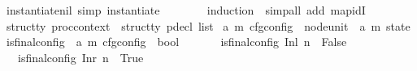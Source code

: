 \begin{isabellebody}
\isanewline
{}\isamarkupfalse%
\ instantiate{\isacharunderscore}{\kern0pt}nil\ {\isacharbrackleft}{\kern0pt}simp{\isacharbrackright}{\kern0pt}{\isacharcolon}{\kern0pt}\ {\isachardoublequoteopen}instantiate\ {\isacharbrackleft}{\kern0pt}{\isacharbrackright}{\kern0pt}\ {\isasymtau}\ {\isacharequal}{\kern0pt}\ {\isasymtau}{\isachardoublequoteclose}\isanewline
%
\isadelimproof
\ \ %
\endisadelimproof
%
\isatagproof
{}\isamarkupfalse%
\ {\isacharparenleft}{\kern0pt}induction\ {\isasymtau}{\isacharparenright}{\kern0pt}\ {\isacharparenleft}{\kern0pt}simp{\isacharunderscore}{\kern0pt}all\ add{\isacharcolon}{\kern0pt}\ map{\isacharunderscore}{\kern0pt}idI{\isacharparenright}{\kern0pt}%
\endisatagproof
{\isafoldproof}%
%
\isadelimproof
\isanewline
%
\endisadelimproof
\isanewline
{}\isamarkupfalse%
\ {\isacharprime}{\kern0pt}struct{\isacharunderscore}{\kern0pt}ty\ proc{\isacharunderscore}{\kern0pt}context\ {\isacharequal}{\kern0pt}\ {\isachardoublequoteopen}{\isacharprime}{\kern0pt}struct{\isacharunderscore}{\kern0pt}ty\ pdecl\ list{\isachardoublequoteclose}\isanewline
\isanewline
{}\isamarkupfalse%
\ {\isacharparenleft}{\kern0pt}{\isacharprime}{\kern0pt}a{\isacharcomma}{\kern0pt}\ {\isacharprime}{\kern0pt}m{\isacharparenright}{\kern0pt}\ cfg{\isacharunderscore}{\kern0pt}config\ {\isacharequal}{\kern0pt}\ {\isachardoublequoteopen}{\isacharparenleft}{\kern0pt}node{\isacharplus}{\kern0pt}unit{\isacharparenright}{\kern0pt}\ {\isasymtimes}\ {\isacharparenleft}{\kern0pt}{\isacharprime}{\kern0pt}a{\isacharcomma}{\kern0pt}\ {\isacharprime}{\kern0pt}m{\isacharparenright}{\kern0pt}\ state{\isachardoublequoteclose}\isanewline
\isanewline
{}\isamarkupfalse%
\ is{\isacharunderscore}{\kern0pt}final{\isacharunderscore}{\kern0pt}config\ {\isacharcolon}{\kern0pt}{\isacharcolon}{\kern0pt}\ {\isachardoublequoteopen}{\isacharparenleft}{\kern0pt}{\isacharprime}{\kern0pt}a{\isacharcomma}{\kern0pt}\ {\isacharprime}{\kern0pt}m{\isacharparenright}{\kern0pt}\ cfg{\isacharunderscore}{\kern0pt}config\ {\isasymRightarrow}\ bool{\isachardoublequoteclose}\isanewline
\ \ \isanewline
\ \ \ \ {\isachardoublequoteopen}is{\isacharunderscore}{\kern0pt}final{\isacharunderscore}{\kern0pt}config\ {\isacharparenleft}{\kern0pt}Inl\ n{\isacharcomma}{\kern0pt}{\isacharunderscore}{\kern0pt}{\isacharparenright}{\kern0pt}\ {\isacharequal}{\kern0pt}\ False{\isachardoublequoteclose}\isanewline
\ \ {\isacharbar}{\kern0pt}\ {\isachardoublequoteopen}is{\isacharunderscore}{\kern0pt}final{\isacharunderscore}{\kern0pt}config\ {\isacharparenleft}{\kern0pt}Inr\ n{\isacharcomma}{\kern0pt}{\isacharunderscore}{\kern0pt}{\isacharparenright}{\kern0pt}\ {\isacharequal}{\kern0pt}\ True{\isachardoublequoteclose}%

\end{isabellebody}
